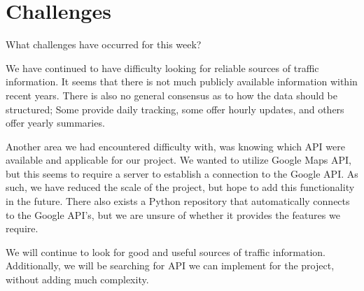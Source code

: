 \section{Challenges}

What challenges have occurred for this week?

We have continued to have difficulty looking for reliable sources of traffic information.
It seems that there is not much publicly available information within recent years.
There is also no general consensus as to how the data should be structured; Some provide daily tracking, some offer hourly updates, and others offer yearly summaries.

Another area we had encountered difficulty with, was knowing which API were available and applicable for our project.
We wanted to utilize Google Maps API, but this seems to require a server to establish a connection to the Google API.
As such, we have reduced the scale of the project, but hope to add this functionality in the future.
There also exists a Python repository that automatically connects to the Google API's, but we are unsure of whether it provides the features we require.

We will continue to look for good and useful sources of traffic information.
Additionally, we will be searching for API we can implement for the project, without adding much complexity.